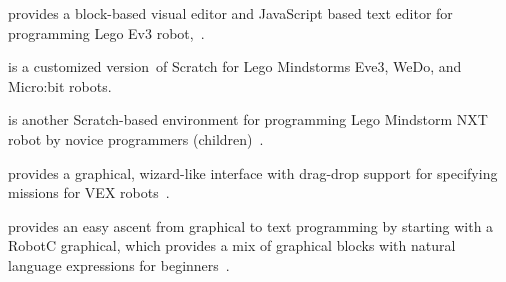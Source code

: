 \parhead{\makecode} provides a block-based visual editor and JavaScript based text editor for programming Lego Ev3 robot, %
\,\cite{makecode}.
 
\parhead{\scratchev} is a customized version\,\cite{scratchEv3} of Scratch for Lego Mindstorms Eve3, WeDo, and Micro:bit robots. %

\parhead{\enchanting} is another Scratch-based environment for programming Lego Mindstorm NXT robot by novice programmers (children)%
\,\cite{enchanting}.%

\parhead{\easyc} provides a graphical, wizard-like interface with drag-drop support for specifying missions for VEX robots%
\,\cite{EasyC}. %


\parhead{\robotc} provides an easy ascent from graphical to text programming  by starting with a RobotC graphical, which provides a mix of graphical blocks with natural language expressions for beginners%
\,\cite{robotc}.
